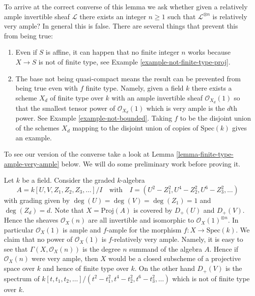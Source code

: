 \noindent
To arrive at the correct converse of this lemma we ask
whether given a relatively ample
invertible sheaf $\mathcal{L}$ there exists an integer $n \geq 1$ such
that $\mathcal{L}^{\otimes n}$ is relatively very ample? In general this
is false. There are several things that prevent this from being true:
\begin{enumerate}
\item Even if $S$ is affine, it can happen that no finite integer
$n$ works because $X \to S$ is not of finite type, see
Example \ref{example-not-finite-type-proj}.
\item The base not being quasi-compact means the result can be
prevented from being true even with $f$ finite type. Namely, given
a field $k$ there exists a scheme $X_d$ of finite type over $k$ with
an ample invertible sheaf $\mathcal{O}_{X_d}(1)$ so that the smallest
tensor power of $\mathcal{O}_{X_d}(1)$ which is very ample is the $d$th
power. See Example \ref{example-not-bounded}.
Taking $f$ to be the disjoint union of the schemes $X_d$ mapping
to the disjoint union of copies of $\text{Spec}(k)$ gives an example.
\end{enumerate}
To see our version of the converse take a look at
Lemma \ref{lemma-finite-type-ample-very-ample} below.
We will do some preliminary work before proving it.

\begin{example}
\label{example-not-finite-type-proj}
Let $k$ be a field.
Consider the graded $k$-algebra
$$
A = k[U, V, Z_1, Z_2, Z_3, \ldots]/I
\quad
\text{with}
\quad
I = (U^2 - Z_1^2, U^4 - Z_2^2, U^6 - Z_3^2, \ldots)
$$
with grading given by $\deg(U) = \deg(V) = \deg(Z_1) = 1$
and $\deg(Z_d) = d$.
Note that $X = \text{Proj}(A)$ is covered by $D_{+}(U)$ and
$D_{+}(V)$. Hence the sheaves $\mathcal{O}_X(n)$ are all
invertible and isomorphic to $\mathcal{O}_X(1)^{\otimes n}$.
In particular $\mathcal{O}_X(1)$ is ample and $f$-ample
for the morphism $f : X \to \text{Spec}(k)$.
We claim that no power of $\mathcal{O}_X(1)$ is $f$-relatively very ample.
Namely, it is easy to see that $\Gamma(X, \mathcal{O}_X(n))$
is the degree $n$ summand of the algebra $A$. Hence if $\mathcal{O}_X(n)$
were very ample, then $X$ would be a closed subscheme of a projective
space over $k$ and hence of finite type over $k$. On the other hand
$D_{+}(V)$ is the spectrum of
$k[t, t_1, t_2, \ldots]/(t^2 - t_1^2, t^4 - t_2^2, t^6 - t_3^2, \ldots)$
which is not of finite type over $k$.
\end{example}

